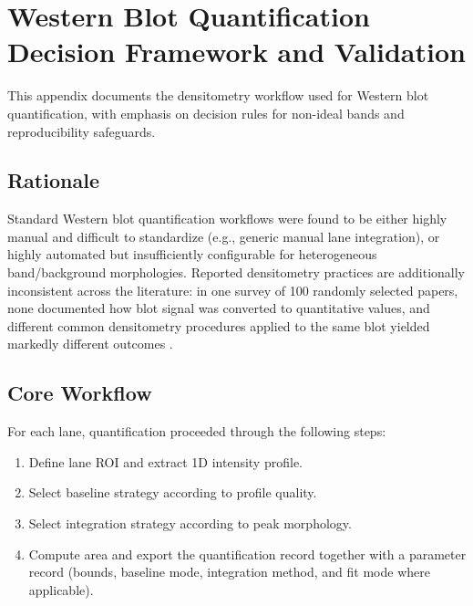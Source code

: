 \chapter{Western Blot Quantification Decision Framework and Validation}
\label{app:wb-quant-framework}

This appendix documents the densitometry workflow used for Western blot quantification, with emphasis on decision rules for non-ideal bands and reproducibility safeguards.

\section{Rationale}

Standard Western blot quantification workflows were found to be either highly manual and difficult to standardize (e.g., generic manual lane integration), or highly automated but insufficiently configurable for heterogeneous band/background morphologies. Reported densitometry practices are additionally inconsistent across the literature: in one survey of 100 randomly selected papers, none documented how blot signal was converted to quantitative values, and different common densitometry procedures applied to the same blot yielded markedly different outcomes \cite{gassmann2009densitometry,butler2019misleading,kroon2022blindspots}. %

\section{Core Workflow}

For each lane, quantification proceeded through the following steps:
\begin{enumerate}
    \item Define lane ROI and extract 1D intensity profile.
    \item Select baseline strategy according to profile quality.
    \item Select integration strategy according to peak morphology.
    \item Compute area and export the quantification record together with a parameter record (bounds, baseline mode, integration method, and fit mode where applicable).
\end{enumerate}


